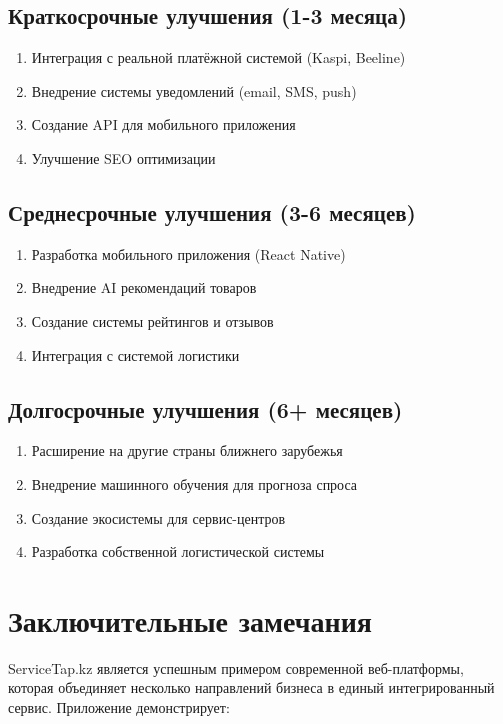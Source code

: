 \documentclass[12pt,a4paper]{report}
\begin{document}
\subsection{Краткосрочные улучшения (1-3 месяца)}
\begin{enumerate}
    \item Интеграция с реальной платёжной системой (Kaspi, Beeline)
    \item Внедрение системы уведомлений (email, SMS, push)
    \item Создание API для мобильного приложения
    \item Улучшение SEO оптимизации
\end{enumerate}

\subsection{Среднесрочные улучшения (3-6 месяцев)}
\begin{enumerate}
    \item Разработка мобильного приложения (React Native)
    \item Внедрение AI рекомендаций товаров
    \item Создание системы рейтингов и отзывов
    \item Интеграция с системой логистики
\end{enumerate}

\subsection{Долгосрочные улучшения (6+ месяцев)}
\begin{enumerate}
    \item Расширение на другие страны ближнего зарубежья
    \item Внедрение машинного обучения для прогноза спроса
    \item Создание экосистемы для сервис-центров
    \item Разработка собственной логистической системы
\end{enumerate}

\section{Заключительные замечания}

ServiceTap.kz является успешным примером современной веб-платформы, которая объединяет несколько направлений бизнеса в единый интегрированный сервис. Приложение демонстрирует:
\end{document}
